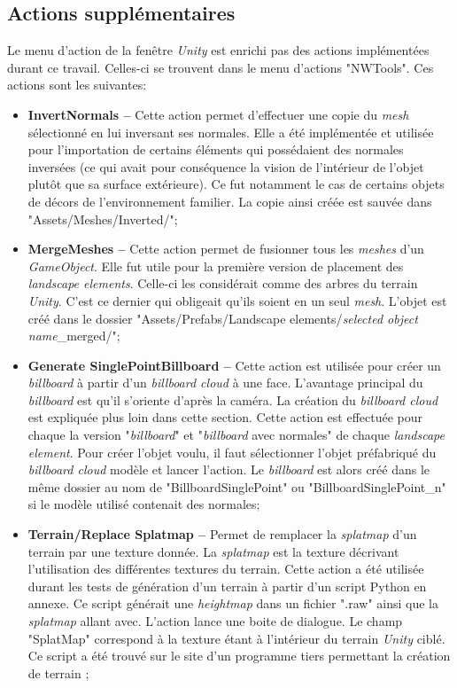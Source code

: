 	\subsection*{Actions supplémentaires}
		Le menu d'action de la fenêtre \textit{Unity} est enrichi pas des actions implémentées durant ce travail. Celles-ci se trouvent dans le menu d'actions "NWTools". Ces actions sont les suivantes:
		\begin{itemize}
			\item \textbf{InvertNormals --} Cette action permet d'effectuer une copie du \textit{mesh} sélectionné en lui inversant ses normales. Elle a été implémentée et utilisée pour l'importation de certains éléments qui possédaient des normales inversées (ce qui avait pour conséquence la vision de l'intérieur de l'objet plutôt que sa surface extérieure). Ce fut notamment le cas de certains objets de décors de l'environnement familier. La copie ainsi créée est sauvée dans "Assets/Meshes/Inverted/";
			
			\item \textbf{MergeMeshes --} Cette action permet de fusionner tous les \textit{meshes} d'un \textit{GameObject}. Elle fut utile pour la première version de placement des \textit{landscape elements}. Celle-ci les considérait comme des arbres du terrain \textit{Unity}. C'est ce dernier qui obligeait qu'ils soient en un seul \textit{mesh}. L'objet est créé dans le dossier "Assets/Prefabs/Landscape elements/\textit{selected object name}\_merged/";
			
			\item \textbf{Generate SinglePointBillboard --} Cette action est utilisée pour créer un \textit{billboard} à partir d'un \textit{billboard cloud} à une face. L'avantage principal du \textit{billboard} est qu'il s'oriente d'après la caméra. La création du \textit{billboard cloud} est expliquée plus loin dans cette section. Cette action est effectuée pour chaque la version "\textit{billboard}" et "\textit{billboard} avec normales" de chaque \textit{landscape element}. Pour créer l'objet voulu, il faut sélectionner l'objet préfabriqué du \textit{billboard cloud} modèle et lancer l'action. Le \textit{billboard} est alors créé dans le même dossier au nom de "BillboardSinglePoint" ou "BillboardSinglePoint\_n" si le modèle utilisé contenait des normales;
			
			\item \textbf{Terrain/Replace Splatmap --} Permet de remplacer la \textit{splatmap} d'un terrain par une texture donnée. La \textit{splatmap} est la texture décrivant l'utilisation des différentes textures du terrain. Cette action a été utilisée durant les tests de génération d'un terrain à partir d'un script Python \cite{python_website} en annexe. Ce script générait une \textit{heightmap} dans un fichier ".raw" ainsi que la \textit{splatmap} allant avec. L'action lance une boite de dialogue. Le champ "SplatMap" correspond à la texture étant à l'intérieur du terrain \textit{Unity} ciblé.
			Ce script a été trouvé sur le site d'un programme tiers permettant la création de terrain \cite{ReplaceSplatmap_sourceWebsite};
			

\end{itemize}
